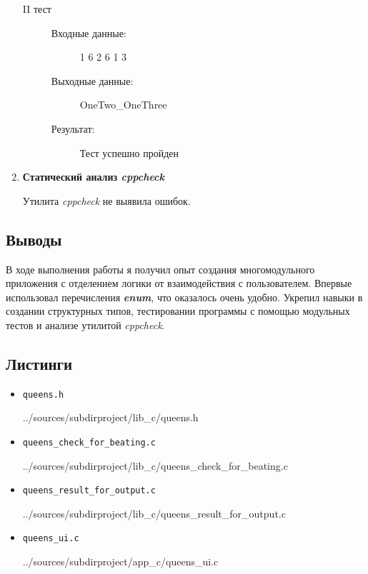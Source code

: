 \documentclass[12pt,a4paper]{report}
\begin{document}
\begin{enumerate}
\begin{description}
\item[II тест]
\hspace{\parindent}
\begin{flushleft}
\begin{description}
\item[Входные данные:] 1 6 2 6 1 3
\item[Выходные данные:] OneTwo\_OneThree
\item[Результат:] Тест успешно пройден
\end{description}
\end{flushleft}
\end{description}

\item \textbf{Статический анализ \textit{cppcheck}}

Утилита \textit{cppcheck} не выявила ошибок.
\end{enumerate}

\subsection{Выводы}
В ходе выполнения работы я получил опыт создания многомодульного приложения с отделением логики от взаимодействия с пользователем. Впервые использовал перечисления \textit{\textbf{enum}}, что оказалось очень удобно. Укрепил навыки в создании структурных типов, тестировании программы с помощью модульных тестов и анализе утилитой \textit{cppcheck}.
\subsection*{Листинги}
\begin{itemize}
\item[] \verb-queens.h-

{../sources/subdirproject/lib_c/queens.h}
\item[] \verb-queens_check_for_beating.c-

{../sources/subdirproject/lib_c/queens_check_for_beating.c}
\item[] \verb-queens_result_for_output.c-

{../sources/subdirproject/lib_c/queens_result_for_output.c}
\item[] \verb-queens_ui.c-

{../sources/subdirproject/app_c/queens_ui.c}
\end{itemize}
%
\end{document}

